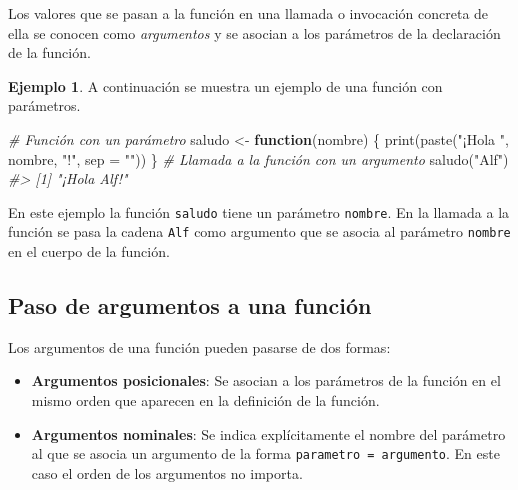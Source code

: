 \documentclass[
]{book}
\newenvironment{Shaded}{\begin{snugshade}}{\end{snugshade}}
\newcommand{\AttributeTok}[1]{\textcolor[rgb]{0.77,0.63,0.00}{#1}}
\newcommand{\CommentTok}[1]{\textcolor[rgb]{0.56,0.35,0.01}{\textit{#1}}}
\newcommand{\ControlFlowTok}[1]{\textcolor[rgb]{0.13,0.29,0.53}{\textbf{#1}}}
\newcommand{\FunctionTok}[1]{\textcolor[rgb]{0.00,0.00,0.00}{#1}}
\newcommand{\NormalTok}[1]{#1}
\newcommand{\OtherTok}[1]{\textcolor[rgb]{0.56,0.35,0.01}{#1}}
\newcommand{\StringTok}[1]{\textcolor[rgb]{0.31,0.60,0.02}{#1}}
\providecommand{\tightlist}{%
  \setlength{\itemsep}{0pt}\setlength{\parskip}{0pt}}
\theoremstyle{definition}
\theoremstyle{definition}
\newtheorem{example}{Ejemplo}[chapter]
\theoremstyle{definition}
\theoremstyle{definition}
\theoremstyle{remark}
\begin{document}
Los valores que se pasan a la función en una llamada o invocación concreta de ella se conocen como \emph{argumentos} y se asocian a los parámetros de la declaración de la función.

\begin{example}
A continuación se muestra un ejemplo de una función con parámetros.

\begin{Shaded}
\begin{Highlighting}[]
\CommentTok{\# Función con un parámetro}
\NormalTok{saludo }\OtherTok{\textless{}{-}} \ControlFlowTok{function}\NormalTok{(nombre) \{}
  \FunctionTok{print}\NormalTok{(}\FunctionTok{paste}\NormalTok{(}\StringTok{"¡Hola "}\NormalTok{, nombre, }\StringTok{"!"}\NormalTok{, }\AttributeTok{sep =} \StringTok{""}\NormalTok{))}
\NormalTok{\}}
\CommentTok{\# Llamada a la función con un argumento}
\FunctionTok{saludo}\NormalTok{(}\StringTok{"Alf"}\NormalTok{)}
\CommentTok{\#\textgreater{} [1] "¡Hola Alf!"}
\end{Highlighting}
\end{Shaded}

En este ejemplo la función \texttt{saludo} tiene un parámetro \texttt{nombre}. En la llamada a la función se pasa la cadena \texttt{Alf} como argumento que se asocia al parámetro \texttt{nombre} en el cuerpo de la función.
\end{example}

\hypertarget{paso-de-argumentos-a-una-funciuxf3n}{%
\subsection{Paso de argumentos a una función}\label{paso-de-argumentos-a-una-funciuxf3n}}

Los argumentos de una función pueden pasarse de dos formas:

\begin{itemize}
\tightlist
\item
  \textbf{Argumentos posicionales}: Se asocian a los parámetros de la función en el mismo orden que aparecen en la definición de la función.
\item
  \textbf{Argumentos nominales}: Se indica explícitamente el nombre del parámetro al que se asocia un argumento de la forma \texttt{parametro\ =\ argumento}. En este caso el orden de los argumentos no importa.
\end{itemize}
\end{document}
